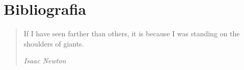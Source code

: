 \documentclass{pracamgr}
\begin{document}

\listoffigures
{} 
\listoftables
{} 



\chapter*{Bibliografia}
 

\begin{quote}

If I have seen farther than others, it is because I was standing on the shoulders of giants.

\raggedleft\slshape Isaac Newton 
\end{quote}


\printbibliography
 


\printindex
\end{document}
